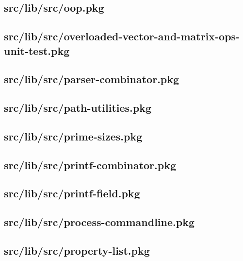 \subsection{src/lib/src/oop.pkg}


\subsection{src/lib/src/overloaded-vector-and-matrix-ops-unit-test.pkg}


\subsection{src/lib/src/parser-combinator.pkg}


\subsection{src/lib/src/path-utilities.pkg}


\subsection{src/lib/src/prime-sizes.pkg}


\subsection{src/lib/src/printf-combinator.pkg}


\subsection{src/lib/src/printf-field.pkg}


\subsection{src/lib/src/process-commandline.pkg}


\subsection{src/lib/src/property-list.pkg}


